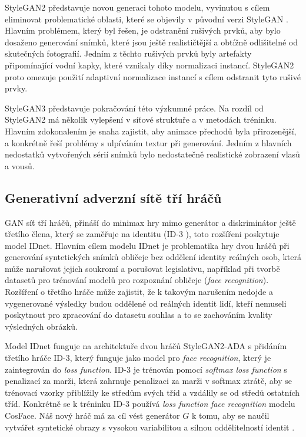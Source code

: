 StyleGAN2 \cite{karras2020analyzing} představuje novou generaci tohoto modelu, vyvinutou s cílem eliminovat problematické oblasti, které se objevily v původní verzi StyleGAN \cite{KarrasStyleGAN}. Hlavním problémem, který byl řešen, je odstranění rušivých prvků, aby bylo dosaženo generování snímků, které jsou ještě realističtější a obtížně odlišitelné od skutečných fotografií. Jedním z těchto rušivých prvků byly artefakty připomínající vodní kapky, které vznikaly díky normalizaci instancí. StyleGAN2 proto omezuje použití adaptivní normalizace instancí s cílem odstranit tyto rušivé prvky.

StyleGAN3 \cite{karras2021alias} představuje pokračování této výzkumné práce. Na rozdíl od StyleGAN2 má několik vylepšení v síťové struktuře a v metodách tréninku. Hlavním zdokonalením je snaha zajistit, aby animace přechodů byla přirozenější, a konkrétně řeší problémy s ulpíváním textur při generování. Jedním z hlavních nedostatků vytvořených sérií snímků bylo nedostatečně realistické zobrazení vlasů a vousů. 

\subsection*{Generativní adverzní sítě tří hráčů}

GAN síť tří hráčů, přináší do minimax hry mimo generátor a diskriminátor ještě třetího člena, který se zaměřuje na identitu (ID-3 \cite{kolf2023identitydriven}), toto rozšířeni poskytuje model IDnet. Hlavním cílem modelu IDnet je problematika hry dvou hráčů při generování syntetických snímků obličeje bez oddělení identity reálných osob, která může narušovat jejich soukromí a porušovat legislativu, například při tvorbě datasetů pro trénování modelů pro rozpoznání obličeje (\textit{face recognition}). Rozšíření o třetího hráče může zajistit, že k takovým narušením nedojde a vygenerované výsledky budou oddělené od reálných identit lidí, kteří nemuseli poskytnout pro zpracování do datasetu souhlas a to se zachováním kvality výsledných obrázků.

Model IDnet funguje na architektuře dvou hráčů StyleGAN2-ADA s přidáním třetího hráče ID-3, který funguje jako model pro \textit{face recognition}, který je zaintegrován do \textit{loss function}. ID-3 je trénován pomocí \textit{softmax loss function} s penalizací za marži, která zahrnuje penalizaci za marži v softmax ztrátě, aby se trénovací vzorky přiblížily ke středům svých tříd a vzdálily se od středů ostatních tříd. Konkrétně se k tréninku ID-3 používá \textit{loss function} \textit{face recognition} modelu CosFace. Náš nový hráč má za cíl vést generátor $G$ k tomu, aby se naučil vytvářet syntetické obrazy s vysokou variabilitou a silnou oddělitelností identit \cite{kolf2023identitydriven}.


